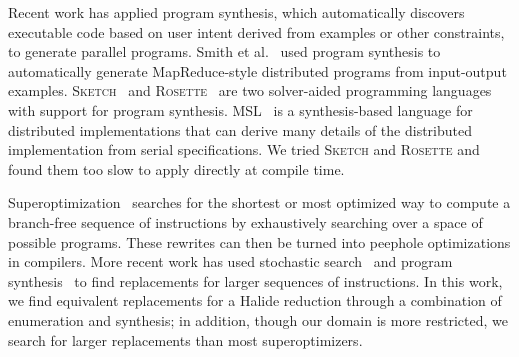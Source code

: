 Recent work has applied program synthesis, which automatically discovers executable code based on user intent derived from examples or other constraints, to generate parallel programs. Smith et al.~\cite{Smith:2016:MPS:2908080.2908102} used program synthesis to automatically generate MapReduce-style distributed programs from input-output examples. \textsc{Sketch}~\cite{Solar-Lezama:2008:PSS:1714168} and \textsc{Rosette}~\cite{Torlak:2013:GSL:2509578.2509586} are two solver-aided programming languages with support for program synthesis.  MSL~\cite{Xu:2014:MSE:2683593.2683628} is a synthesis-based language for distributed implementations that can derive many details of the distributed implementation from serial specifications. We tried \textsc{Sketch} and \textsc{Rosette} and found them too slow to apply directly at compile time.

Superoptimization~\cite{Granlund:1992:EBU:143095.143146, Massalin:1987:SLS:36206.36194} searches for the shortest or most optimized way to compute a branch-free sequence of instructions by exhaustively searching over a space of possible programs. These rewrites can then be turned into peephole optimizations in compilers. More recent work has used stochastic search~\cite{Phothilimthana:2016:SUS:2872362.2872387, Schkufza:2013:SS:2490301.2451150} and program synthesis~\cite{Lopes:2015:PCP:2737924.2737965} to find replacements for larger sequences of instructions.
In this work, we find equivalent replacements for a Halide reduction through a combination of enumeration and synthesis; in addition, though our domain is more restricted, we search for larger replacements than most superoptimizers.
